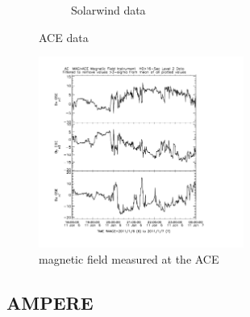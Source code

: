 \documentclass[10pt,a4paper]{article}
\begin{document}
\begin{figure}[h]
\begin{subfigure}{0.45\textwidth}
	\caption{ Solarwind data\label{ACE Solarwindspeed}}
\end{subfigure}
\caption{ACE data}
\end{figure}

\begin{figure}
\centering
\includegraphics[width=0.6\textwidth]{ACE_magneticfield.pdf}
\caption{magnetic field measured at the ACE}
\end{figure}


\subsection{AMPERE}
\end{document}
